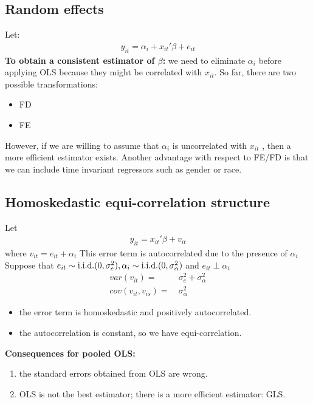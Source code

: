 \documentclass[a4paper,twoside,11pt]{article}
\begin{document}
\subsection{Random effects}
Let:
\begin{equation*}
\begin{aligned}
y_{it} = \alpha_i + x_{it}' \beta + e_{it}
\end{aligned} 
\end{equation*}
\textbf{To obtain a consistent estimator of $\beta$:}
\newline
we need to eliminate $\alpha_i$ before applying OLS because they might be correlated with $x_{it}$. So far, there are two possible transformations:
\begin{itemize}
    \item FD
    \item FE
\end{itemize}
However, \textcolor{NavyBlue}{if we are willing to assume that $\alpha_i$ is uncorrelated with $x_{it}$} , then a more efficient estimator exists.
\newline
\newline
Another advantage with respect to FE/FD is that we can include time invariant regressors such as gender or race.
\subsection{Homoskedastic equi-correlation structure}
Let
\begin{equation*}
\begin{aligned}
y_{it} = x_{it}' \beta + v_{it}
\end{aligned} 
\end{equation*}
where $v_{it} = e_{it} + \alpha_i$ This \textcolor{NavyBlue}{error term is
autocorrelated} due to the presence of $\alpha_i$
\newline
\newline
Suppose that $e_{it} \sim \textmd{i.i.d.}(0, \sigma^2_e), \alpha_i \sim \textmd{i.i.d.} (0, \sigma^2_\alpha)$ and $e_{it} \perp \alpha_i$
\begin{equation*}
\begin{aligned}
var(v_{it}) =& \ \sigma_e^2 + \sigma_\alpha^2 \\
cov(v_{it}, v_{is})=& \ \sigma_\alpha^2
\end{aligned} 
\end{equation*}
\begin{itemize}
    \item \textcolor{NavyBlue}{the error term is homoskedastic and positively autocorrelated.}
    \item \textcolor{NavyBlue}{the autocorrelation is constant, so we have equi-correlation.}
\end{itemize}
\textbf{Consequences for pooled OLS:}
\begin{enumerate}
    \item the standard errors obtained from OLS are wrong.
    \item OLS is not the best estimator; there is a more efficient estimator: GLS.
\end{enumerate}
\end{document}
